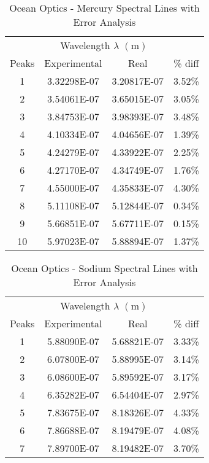 \documentclass[12pt]{article}
\begin{document}
	\begin{table}[htbp]
		\centering
		\caption{Ocean Optics - Mercury Spectral Lines with Error Analysis}
		\begin{tabular}{cccc}
			\toprule
			& \multicolumn{2}{c}{Wavelength $\lambda$ $(\unit{\meter})$} &  \\
			\cmidrule{2-3} Peaks & Experimental & Real & \% diff \\
			\midrule
			1 & 3.32298E-07 & 3.20817E-07 & 3.52\% \\
			2 & 3.54061E-07 & 3.65015E-07 & 3.05\% \\
			3 & 3.84753E-07 & 3.98393E-07 & 3.48\% \\
			4 & 4.10334E-07 & 4.04656E-07 & 1.39\% \\
			5 & 4.24279E-07 & 4.33922E-07 & 2.25\% \\
			6 & 4.27170E-07 & 4.34749E-07 & 1.76\% \\
			7 & 4.55000E-07 & 4.35833E-07 & 4.30\% \\
			8 & 5.11108E-07 & 5.12844E-07 & 0.34\% \\
			9 & 5.66851E-07 & 5.67711E-07 & 0.15\% \\
			10 & 5.97023E-07 & 5.88894E-07 & 1.37\% \\
			\bottomrule
		\end{tabular}%
		\label{tab:OceanViewMercurySpectralLineswithErrorAnalysis}%
	\end{table}%
	
	
	\begin{table}[htbp]
		\centering
		\caption{Ocean Optics - Sodium Spectral Lines with Error Analysis}
		\begin{tabular}{cccc}
			\toprule
			& \multicolumn{2}{c}{Wavelength $\lambda$ $(\unit{\meter})$} &  \\
			\cmidrule{2-3} Peaks & Experimental & Real & \% diff \\
			\midrule
			1 & 5.88090E-07 & 5.68821E-07 & 3.33\% \\
			2 & 6.07800E-07 & 5.88995E-07 & 3.14\% \\
			3 & 6.08600E-07 & 5.89592E-07 & 3.17\% \\
			4 & 6.35282E-07 & 6.54404E-07 & 2.97\% \\
			5 & 7.83675E-07 & 8.18326E-07 & 4.33\% \\
			6 & 7.86688E-07 & 8.19479E-07 & 4.08\% \\
			7 & 7.89700E-07 & 8.19482E-07 & 3.70\% \\
			\bottomrule
		\end{tabular}%
		\label{tab:OceanViewSodiumSpectralLineswithErrorAnalysis}%
	\end{table}%
	
\end{document}
